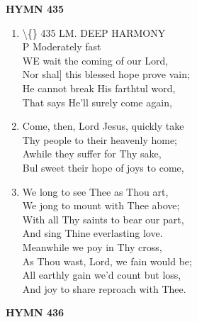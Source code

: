 \documentclass[11pt,a4paper]{article}
\begin{document}
\newpage
\begin{center}
    {\Large \textbf{HYMN 435}}
\end{center}
\vspace{1em}

\begin{enumerate}
    \item \textbackslash\{\} 435 LM. DEEP HARMONY \\
        P Moderately fast \\
        WE wait the coming of our Lord, \\
        Nor shal] this blessed hope prove vain; \\
        He cannot break His farthtul word, \\
        That says He'll surely come again,

    \item Come, then, Lord Jesus, quickly take \\
        Thy people to their heavenly home; \\
        Awhile they suffer for Thy sake, \\
        Bul sweet their hope of joys to come,

    \item We long to see Thee as Thou art, \\
        We jong to mount with Thee above; \\
        With all Thy saints to bear our part, \\
        And sing Thine everlasting love. \\
        Meanwhile we poy in Thy cross, \\
        As Thou wast, Lord, we fain would be; \\
        All earthly gain we'd count but loss, \\
        And joy to share reproach with Thee.

\end{enumerate}

\newpage
\begin{center}
    {\Large \textbf{HYMN 436}}
\end{center}
\vspace{1em}
\end{document}

